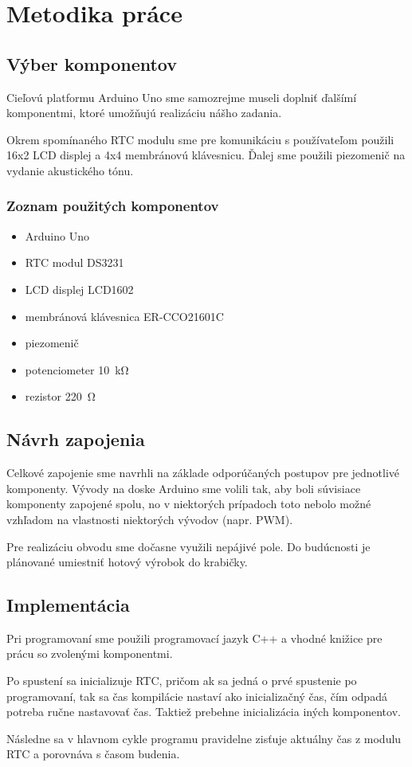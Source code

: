 \chapter{Metodika práce}

\section{Výber komponentov}
Cieľovú platformu Arduino Uno sme samozrejme museli doplniť ďalšímí komponentmi, ktoré umožňujú realizáciu nášho zadania.

Okrem spomínaného RTC modulu sme pre komunikáciu s používateľom použili 16x2 LCD displej a 4x4 membránovú klávesnicu. Ďalej sme použili piezomenič na vydanie akustického tónu.

\subsection{Zoznam použitých komponentov}
\begin{itemize}
    \item Arduino Uno
    \item RTC modul DS3231
    \item LCD displej LCD1602
    \item membránová klávesnica ER-CCO21601C
    \item piezomenič
    \item potenciometer \SI{10}{\kilo\ohm}
    \item rezistor \SI{220}{\ohm}
\end{itemize}

\section{Návrh zapojenia}
Celkové zapojenie sme navrhli na základe odporúčaných postupov pre jednotlivé komponenty. Vývody na doske Arduino sme volili tak, aby boli súvisiace komponenty zapojené spolu, no v niektorých prípadoch toto nebolo možné vzhľadom na vlastnosti niektorých vývodov (napr. PWM).

Pre realizáciu obvodu sme dočasne využili nepájivé pole. Do budúcnosti je plánované umiestniť hotový výrobok do krabičky.

\section{Implementácia}
Pri programovaní sme použili programovací jazyk C++ a vhodné knižice pre prácu so zvolenými komponentmi.

Po spustení sa inicializuje RTC, pričom ak sa jedná o prvé spustenie po programovaní, tak sa čas kompilácie nastaví ako inicializačný čas, čím odpadá potreba ručne nastavovať čas. Taktiež prebehne inicializácia iných komponentov.

Následne sa v hlavnom cykle programu pravidelne zisťuje aktuálny čas z modulu RTC a porovnáva s časom budenia.
